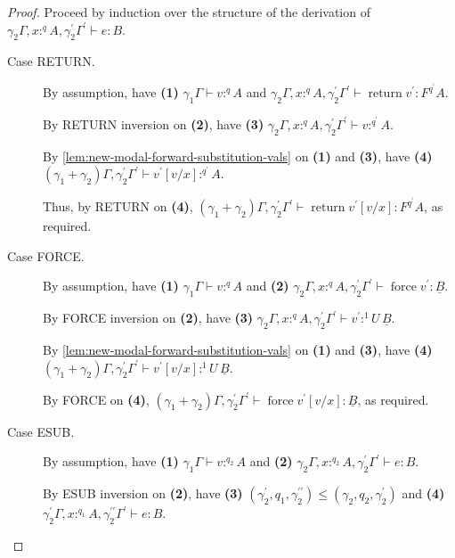 \documentclass[acmsmall,screen,nonacm]{acmart}
\DeclareMathOperator{\force}{\text{force}}
\DeclareMathOperator{\return}{\text{return}}
\newcommand{\tee}{\vdash}
\begin{document}
\begin{proof}
  Proceed by induction over the structure of the derivation of $\gamma_2\Gamma, x :^q A, \gamma_2^\prime\Gamma^\prime \tee e : B$.
  
  \begin{description}
    \item[Case RETURN.]
    By assumption, have \textbf{(1)} $\gamma_1\Gamma \tee v :^q A$ and $\gamma_2\Gamma, x :^q A, \gamma_2^\prime\Gamma^\prime \tee \return v^\prime : F^{q^\prime} A$.

    By RETURN inversion on \textbf{(2)}, have \textbf{(3)} $\gamma_2\Gamma, x :^q A, \gamma_2^\prime\Gamma^\prime \tee v :^{q^\prime} A$.

    By \ref{lem:new-modal-forward-substitution-vals} on \textbf{(1)} and \textbf{(3)}, have \textbf{(4)} $(\gamma_1 + \gamma_2)\Gamma, \gamma_2^\prime\Gamma^\prime \tee v^\prime[v/x] :^{q^\prime} A$.

    Thus, by RETURN on \textbf{(4)}, $(\gamma_1 + \gamma_2)\Gamma, \gamma_2^\prime\Gamma^\prime \tee \return v^\prime[v/x] : F^{q^\prime} A$, as required.
    \\
    \item[Case FORCE.]
    By assumption, have \textbf{(1)} $\gamma_1\Gamma \tee v :^q A$ and \textbf{(2)} $\gamma_2\Gamma, x :^q A, \gamma_2^\prime\Gamma^\prime \tee \force v^\prime : \underline{B}$.

    By FORCE inversion on \textbf{(2)}, have \textbf{(3)} $\gamma_2\Gamma, x :^q A, \gamma_2^\prime\Gamma^\prime \tee v^\prime :^1 U \, \underline{B}$.

    By \ref{lem:new-modal-forward-substitution-vals} on \textbf{(1)} and \textbf{(3)}, have \textbf{(4)} $(\gamma_1 + \gamma_2)\Gamma, \gamma_2^\prime\Gamma^\prime \tee v^\prime[v/x] :^1 U \, \underline{B}$.

    By FORCE on \textbf{(4)}, $(\gamma_1 + \gamma_2)\Gamma, \gamma_2^\prime\Gamma^\prime \tee \force v^\prime[v/x] : \underline{B}$, as required.
    \\
    \item[Case ESUB.]
    By assumption, have \textbf{(1)} $\gamma_1\Gamma \tee v :^{q_2} A$ and \textbf{(2)} $\gamma_2\Gamma, x :^{q_2} A, \gamma_2^\prime\Gamma^\prime \tee e : B$.

    By ESUB inversion on \textbf{(2)}, have \textbf{(3)} $(\gamma_2^\prime, q_1, \gamma_2^{\prime\prime}) \le (\gamma_2, q_2, \gamma_2^\prime)$ and \textbf{(4)} $\gamma_2^\prime\Gamma, x :^{q_1} A, \gamma_2^{\prime\prime}\Gamma^\prime \tee e : B$.


\end{description}
\end{proof}
\end{document}
